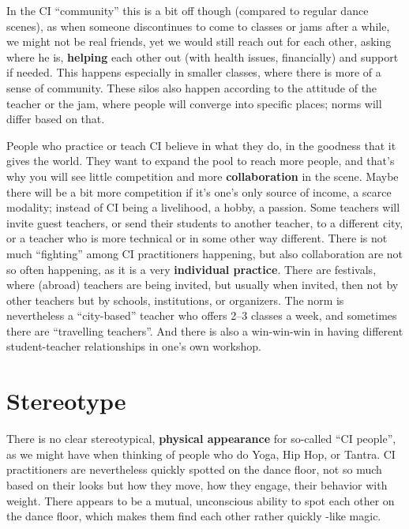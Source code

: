 In the CI ``community'' this is a bit off though (compared to regular dance scenes), as when someone discontinues to come to classes or jams after a while, we might not be real friends, yet we would still reach out for each other, asking where he is, \textbf{helping} each other out (with health issues, financially) and support if needed.
This happens especially in smaller classes, where there is more of a sense of community.
These silos also happen according to the attitude of the teacher or the jam, where people will converge into specific places; norms will differ based on that.

People who practice or teach CI believe in what they do, in the goodness that it gives the world.
They want to expand the pool to reach more people, and that's why you will see little competition and more \textbf{collaboration} in the scene.
Maybe there will be a bit more competition if it's one's only source of income, a scarce modality; instead of CI being a livelihood, a hobby, a passion.
Some teachers will invite guest teachers, or send their students to another teacher, to a different city, or a teacher who is more technical or in some other way different.
There is not much ``fighting'' among CI practitioners happening, but also collaboration are not so often happening, as it is a very \textbf{individual practice}.
There are festivals, where (abroad) teachers are being invited, but usually when invited, then not by other teachers but by schools, institutions, or organizers.
The norm is nevertheless a ``city-based'' teacher who offers 2--3 classes a week, and sometimes there are ``travelling teachers''.
And there is also a win-win-win in having different student-teacher relationships in one's own workshop.

\section{Stereotype}\label{sec:stereotype}

There is no clear stereotypical, \textbf{physical appearance} for so-called ``CI people'', as we might have when thinking of people who do Yoga, Hip Hop, or Tantra.
CI practitioners are nevertheless quickly spotted on the dance floor, not so much based on their looks but how they move, how they engage, their behavior with weight.
There appears to be a mutual, unconscious ability to spot each other on the dance floor, which makes them find each other rather quickly -like magic.

